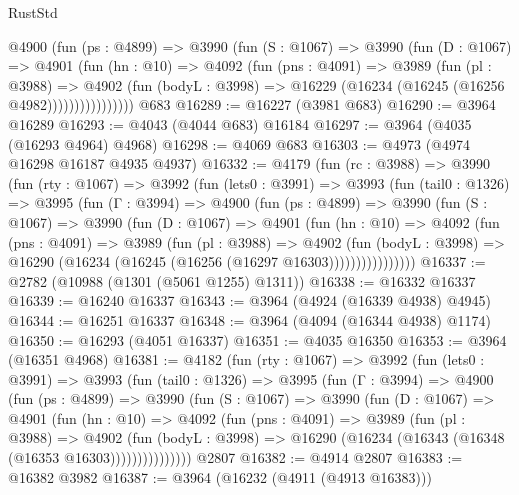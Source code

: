 \begin{lexlean}{RustStd}
\begin{coremodule}
              @4900
                (fun (ps : @4899) =>
                @3990
                  (fun (S : @1067) =>
                  @3990
                    (fun (D : @1067) =>
                    @4901
                      (fun (hn : @10) =>
                      @4092
                        (fun (pns : @4091) =>
                        @3989
                          (fun (pl : @3988) =>
                          @4902
                            (fun (bodyL : @3998) =>
                            @16229 (@16234 (@16245 (@16256 @4982))))))))))))))))
    @683
@16289 := @16227 (@3981 @683)
@16290 := @3964 @16289
@16293 := @4043 (@4044 @683) @16184
@16297 := @3964 (@4035 (@16293 @4964) @4968)
@16298 := @4069 @683
@16303 := @4973 (@4974 @16298 @16187 @4935 @4937)
@16332 := @4179
    (fun (rc : @3988) =>
    @3990
      (fun (rty : @1067) =>
      @3992
        (fun (lets0 : @3991) =>
        @3993
          (fun (tail0 : @1326) =>
          @3995
            (fun (Γ : @3994) =>
            @4900
              (fun (ps : @4899) =>
              @3990
                (fun (S : @1067) =>
                @3990
                  (fun (D : @1067) =>
                  @4901
                    (fun (hn : @10) =>
                    @4092
                      (fun (pns : @4091) =>
                      @3989
                        (fun (pl : @3988) =>
                        @4902
                          (fun (bodyL : @3998) =>
                          @16290 (@16234 (@16245 (@16256 (@16297 @16303))))))))))))))))
@16337 := @2782 (@10988 (@1301 (@5061 @1255) @1311))
@16338 := @16332 @16337
@16339 := @16240 @16337
@16343 := @3964 (@4924 (@16339 @4938) @4945)
@16344 := @16251 @16337
@16348 := @3964 (@4094 (@16344 @4938) @1174)
@16350 := @16293 (@4051 @16337)
@16351 := @4035 @16350
@16353 := @3964 (@16351 @4968)
@16381 := @4182
    (fun (rty : @1067) =>
    @3992
      (fun (lets0 : @3991) =>
      @3993
        (fun (tail0 : @1326) =>
        @3995
          (fun (Γ : @3994) =>
          @4900
            (fun (ps : @4899) =>
            @3990
              (fun (S : @1067) =>
              @3990
                (fun (D : @1067) =>
                @4901
                  (fun (hn : @10) =>
                  @4092
                    (fun (pns : @4091) =>
                    @3989
                      (fun (pl : @3988) =>
                      @4902
                        (fun (bodyL : @3998) =>
                        @16290 (@16234 (@16343 (@16348 (@16353 @16303)))))))))))))))
    @2807
@16382 := @4914 @2807
@16383 := @16382 @3982
@16387 := @3964 (@16232 (@4911 (@4913 @16383)))

\end{coremodule}
\end{lexlean}
